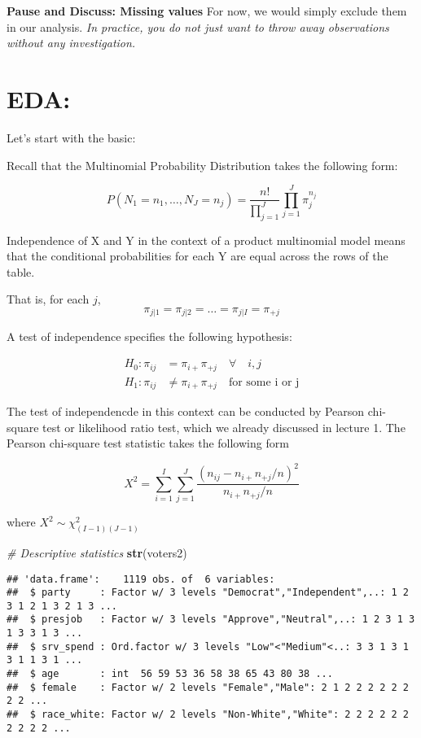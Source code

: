 \documentclass[]{article}
\newenvironment{Shaded}{\begin{snugshade}}{\end{snugshade}}
\newcommand{\KeywordTok}[1]{\textcolor[rgb]{0.13,0.29,0.53}{\textbf{{#1}}}}
\newcommand{\CommentTok}[1]{\textcolor[rgb]{0.56,0.35,0.01}{\textit{{#1}}}}
\newcommand{\NormalTok}[1]{{#1}}
\begin{document}
\textbf{Pause and Discuss: Missing values} For now, we would simply
exclude them in our analysis. \emph{In practice, you do not just want to
throw away observations without any investigation.}

\section{EDA:}\label{eda-1}

Let's start with the basic:

Recall that the Multinomial Probability Distribution takes the following
form:

\[ P(N_1 = n_1, \dots , N_J = n_j) = \frac{n!}{\prod_{j=1}^J} \prod_{j=1}^J \pi_j^{n_j} \]

Independence of X and Y in the context of a product multinomial model
means that the conditional probabilities for each Y are equal across the
rows of the table.

That is, for each \(j\),
\[\pi_{j|1} = \pi_{j|2} = \dots = \pi_{j|I} = \pi_{+j}\]

A test of independence specifies the following hypothesis:

\[
\begin{aligned}
  H_0: \pi_{ij} &= \pi_{i+}\pi_{+j} \quad \forall \quad i,j \\
  H_1: \pi_{ij} &\neq \pi_{i+}\pi_{+j} \quad \text{for some i or j}
\end{aligned}  
\]

The test of independencde in this context can be conducted by Pearson
chi-square test or likelihood ratio test, which we already discussed in
lecture 1. The Pearson chi-square test statistic takes the following
form

\[
X^2 = \sum_{i=1}^I \sum_{j=1}^J \frac{(n_{ij}-n_{i+}n_{+j}/n)^2}{n_{i+}n_{+j}/n}
\]

where \(X^2 \sim \chi^2_{(I-1)(J-1)}\)

\begin{Shaded}
\begin{Highlighting}[]
\CommentTok{# Descriptive statistics}
\KeywordTok{str}\NormalTok{(voters2)}
\end{Highlighting}
\end{Shaded}

\begin{verbatim}
## 'data.frame':    1119 obs. of  6 variables:
##  $ party     : Factor w/ 3 levels "Democrat","Independent",..: 1 2 3 1 2 1 3 2 1 3 ...
##  $ presjob   : Factor w/ 3 levels "Approve","Neutral",..: 1 2 3 1 3 1 3 3 1 3 ...
##  $ srv_spend : Ord.factor w/ 3 levels "Low"<"Medium"<..: 3 3 1 3 1 3 1 1 3 1 ...
##  $ age       : int  56 59 53 36 58 38 65 43 80 38 ...
##  $ female    : Factor w/ 2 levels "Female","Male": 2 1 2 2 2 2 2 2 2 2 ...
##  $ race_white: Factor w/ 2 levels "Non-White","White": 2 2 2 2 2 2 2 2 2 2 ...
\end{verbatim}
\end{document}
